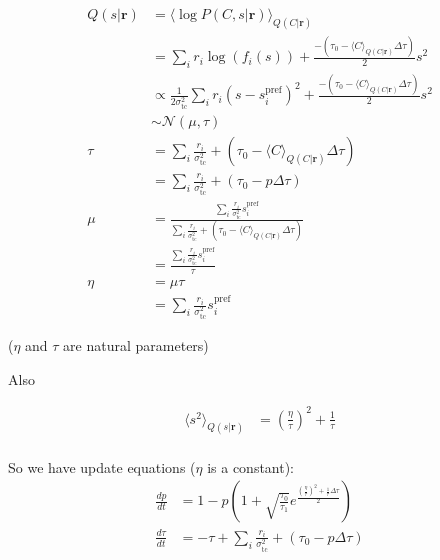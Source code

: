 \documentclass[12pt]{article}
\begin{document}
\begin{equation}
\begin{aligned}
Q(s|\mathbf{r}) &= \langle \log P(C, s|\mathbf{r}) \rangle_{Q(C|\mathbf{r})}\\
&= \sum_i r_i \log(f_i(s)) + \frac{- (\tau_0 - \langle C \rangle_{Q(C|\mathbf{r})} \Delta \tau)}{2} s^2\\
&\propto \frac{1}{2 \sigma^2_{\text{tc}}} \sum_i r_i (s - s_i^{\text{pref}})^2 + \frac{- (\tau_0 - \langle C \rangle_{Q(C|\mathbf{r})} \Delta \tau)}{2} s^2\\
&\sim \mathcal{N} (\mu, \tau)\\
\tau &= \sum_i \frac{r_i}{\sigma^2_{\text{tc}}}+ (\tau_0 - \langle C \rangle_{Q(C|\mathbf{r})} \Delta \tau)\\
&= \sum_i \frac{r_i}{\sigma^2_{\text{tc}}}+ (\tau_0 - p \Delta \tau)\\
\mu &= \frac{\sum_i \frac{r_i}{\sigma^2_{\text{tc}}}s_i^{\text{pref}}}{\sum_i \frac{r_i}{\sigma^2_{\text{tc}}}+ (\tau_0 - \langle C \rangle_{Q(C|\mathbf{r})} \Delta \tau)}\\
&= \frac{\sum_i \frac{r_i}{\sigma^2_{\text{tc}}}s_i^{\text{pref}}}{\tau}\\
\eta &= \mu \tau\\
&= \sum_i \frac{r_i}{\sigma^2_{\text{tc}}}s_i^{\text{pref}}
\end{aligned}
\end{equation}

($\eta$ and $\tau$ are natural parameters)

Also

\begin{equation}
\begin{aligned}
\langle s^2 \rangle_{Q(s|\mathbf{r})} &= (\frac{\eta}{\tau})^2 + \frac{1}{\tau}\\
\end{aligned}
\end{equation}

So we have update equations ($\eta$ is a constant):
\begin{equation}
\begin{aligned}
\frac{dp}{dt} &= 1 - p(1 + \sqrt{\frac{\tau_0}{\tau_1}} e^{\frac{(\frac{\eta}{\tau})^2 + \frac{1}{\tau} \Delta \tau}{2}})\\
\frac{d \tau}{dt} &= -\tau + \sum_i \frac{r_i}{\sigma^2_{\text{tc}}}+ (\tau_0 - p \Delta \tau)\\
\end{aligned}
\end{equation}
\end{document}
